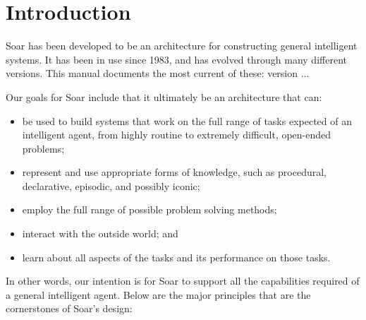 \chapter{Introduction}
\label{INTRO}

Soar has been developed to be an architecture for constructing general
intelligent systems. It has been in use since 1983, and has evolved through
many different versions. This manual documents the most current of these:
version \SoarVersionMajor.\SoarVersionMinor.\SoarVersionRevision.

Our goals for Soar include that it ultimately be an architecture that can: \vspace{-12pt}

\begin{itemize} 
\item be used to build systems that work on the full range of tasks expected
	of an \linebreak intelligent agent, from highly routine to extremely difficult,
	open-ended problems;\vspace{-6pt}
\item represent and use appropriate forms of knowledge, such as procedural,
	declarative, episodic, and possibly iconic;\vspace{-6pt}
\item employ the full range of possible problem solving methods;\vspace{-6pt}
\item interact with the outside world; and\vspace{-6pt}
\item learn about all aspects of the tasks and its performance on those tasks.
\end{itemize} 

In other words, our intention is for Soar to support all the capabilities
required of a general intelligent agent. Below are the major principles that
are the cornerstones of Soar's design:  \vspace{-12pt}

